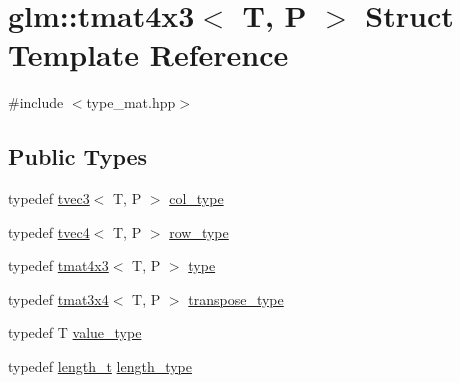 \hypertarget{structglm_1_1tmat4x3}{}\section{glm\+::tmat4x3$<$ T, P $>$ Struct Template Reference}
\label{structglm_1_1tmat4x3}


{\ttfamily \#include $<$type\+\_\+mat.\+hpp$>$}

\subsection*{Public Types}
\begin{DoxyCompactItemize}
\item 
typedef \mbox{\hyperlink{structglm_1_1tvec3}{tvec3}}$<$ T, P $>$ \mbox{\hyperlink{structglm_1_1tmat4x3_ac64f78f27c32014f7d72233969526430}{col\+\_\+type}}
\item 
typedef \mbox{\hyperlink{structglm_1_1tvec4}{tvec4}}$<$ T, P $>$ \mbox{\hyperlink{structglm_1_1tmat4x3_aeed2de6aadeb405b11529071cddb9fe9}{row\+\_\+type}}
\item 
typedef \mbox{\hyperlink{structglm_1_1tmat4x3}{tmat4x3}}$<$ T, P $>$ \mbox{\hyperlink{structglm_1_1tmat4x3_a3aedff8ef82d31052444d388ededef55}{type}}
\item 
typedef \mbox{\hyperlink{structglm_1_1tmat3x4}{tmat3x4}}$<$ T, P $>$ \mbox{\hyperlink{structglm_1_1tmat4x3_a367488f91f7e419b75ddee7fe2d44a20}{transpose\+\_\+type}}
\item 
typedef T \mbox{\hyperlink{structglm_1_1tmat4x3_ad877c31a46be38d67ef6e93881c44ecf}{value\+\_\+type}}
\item 
typedef \mbox{\hyperlink{namespaceglm_a090a0de2260835bee80e71a702492ed9}{length\+\_\+t}} \mbox{\hyperlink{structglm_1_1tmat4x3_a2f1ac502cc552a921a905e8a858fb1d7}{length\+\_\+type}}
\end{DoxyCompactItemize}
